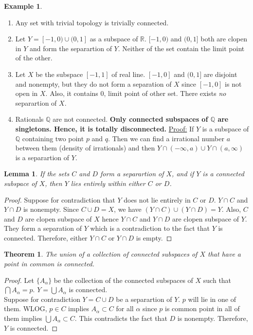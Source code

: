 \documentclass[12pt,reqno]{amsart}
\theoremstyle{plain}
\newtheorem{thm}{Theorem}
\newtheorem{lem}{Lemma}
\theoremstyle{definition}
\newtheorem{eg}{Example}
\newcommand{\bb}[1]{\mathbb{#1}}
\begin{document}
\begin{eg}
    \begin{enumerate}
    \item Any set with trivial topology is trivially connected.
    \item Let $Y = [-1, 0) \cup (0,1]$ as a subspace of $\bb R$. $[-1, 0)$ and $(0,1]$ both are clopen in $Y$ and form the separartion of $Y$. Neither of the set contain the limit point of the other.
    \item Let $X$ be the subspace $[-1,1]$ of real line. $[-1, 0]$ and $(0,1]$ are disjoint and nonempty, but they do not form a separation of $X$ since $[-1,0]$ is not open in $X$. Also, it contains $0$, limit point of other set. There exists {\it no} separartion of $X$.
    \item Rationals $\bb Q$ are not connected. {\bf Only connected subspaces of $\bb Q$ are singletons. Hence, it is totally disconnected.} \underline{Proof:} If $Y$ is a subspace of $\bb Q$ containing two point $p$ and $q$. Then we can find a irrational number $a$ between them (density of irrationals) and then $Y \cap (-\infty, a) \cup Y \cap (a, \infty)$ is a separartion of $Y$. 
    \end{enumerate}
\end{eg}
\begin{lem}
    If the sets $C$ and $D$ form a separartion of $X$, and if $Y$ is a connected subspace of $X$, then $Y$ lies entirely within either $C$ or $D$.
\end{lem}
\begin{proof}
    Suppose for contradiction that $Y$ does not lie entirely in $C$ or $D$. $Y \cap C$ and $Y \cap D$ is nonempty. Since $C \cup D = X$, we have $(Y \cap C) \cup (Y \cap D) = Y$. Also, $C$ and $D$ are clopen subspace of $X$ hence $Y \cap C$ and $Y \cap D$ are clopen subspace of $Y$. They form a separation of $Y$ which is a contradiction to the fact that $Y$ is connected. Therefore, either $Y \cap C$ or $Y \cap D$ is empty.
\end{proof}
\begin{thm}
    The union of a collection of connected subspaces of $X$ that have a point in common is connected.
\end{thm}
\begin{proof}
    Let $\{A_\alpha\}$ be the collection of the connected subspaces of $X$ such that $\bigcap A_\alpha = p$.  $Y = \bigcup A_\alpha$ is connected. \\ Suppose for contradiction $Y = C \cup D$ be a separartion of $Y$. $p$ will lie in one of them. WLOG, $p \in C$ implies $A_\alpha \subset C$ for all $\alpha$ since $p$ is common point in all of them implies $\bigcup A_\alpha\subset C$. This contradicts the fact that $D$ is nonempty. Therefore, $Y$ is connected. 
\end{proof}
\end{document}
